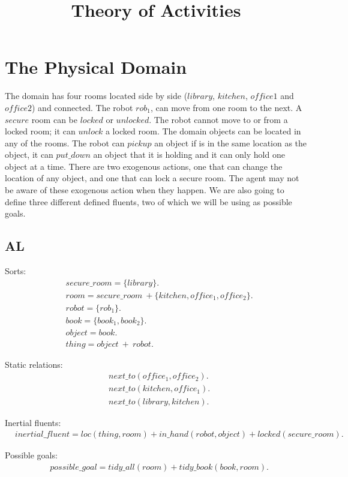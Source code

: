 \documentclass[11pt, oneside]{article}
\title{Theory of Activities}
\begin{document}
\maketitle

\section{The Physical Domain}
The domain has four rooms located side by side ($library$, $kitchen$, $office1$ and
$office2$) and connected. The robot $rob_1$,
can move from one room to the next. A $secure$ room can be $locked$ or $unlocked$. The robot cannot move to or from
a locked room; it can $unlock$ a locked room. The domain objects
can be located in any of the rooms. The robot can $pickup$ an
object if is in the same location as the object, it can
$put\_down$ an object that it is holding and it can only hold
one object at a time. There are two exogenous actions, one
that can change the location of any object, and one that can
lock a secure room. The agent may not be aware of these
exogenous action when they happen. We are also going to define three different 
defined fluents, two of which we will be using as possible goals. 

\subsection{AL}
Sorts:
\begin{align*}
  &secure\_room = \{library\}.\\
  &room = secure\_room\ +\{kitchen, office_1, office_2\}.\\
  &robot = \{rob_1\}.\\
  &book = \{book_1, book_2\}.\\
  &object = book.\\
  &thing = object\ +\ robot.
\end{align*}

Static relations:
\begin{align*}
  &next\_to(office_1,office_2).\\
  &next\_to(kitchen,office_1).\\
  &next\_to(library,kitchen).
  \end{align*}

Inertial fluents:
\begin{align*}
  &inertial\_fluent = loc(thing, room) + in\_hand(robot,object) + locked(secure\_room).
  \end{align*}

Possible goals:
\begin{align*}
&possible\_goal = tidy\_all(room) + tidy\_book(book,room).
\end{align*}
\end{document}
